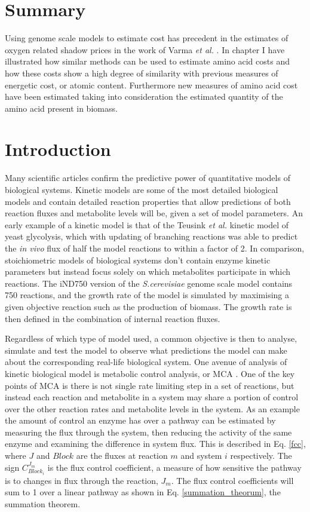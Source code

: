 \section*{Summary}

Using genome scale models to estimate cost has precedent in the estimates of oxygen related shadow prices in the work of Varma \emph{et al.} \cite{varma1993}. In chapter I have illustrated how similar methods can be used to estimate amino acid costs and how these costs show a high degree of similarity with previous measures of energetic cost, or atomic content. Furthermore new measures of amino acid cost have been estimated taking into consideration the estimated quantity of the amino acid present in biomass.

\clearpage

\section{Introduction}

Many scientific articles confirm the predictive power of quantitative models of biological systems. Kinetic models are some of the most detailed biological models and contain detailed reaction properties that allow predictions of both reaction fluxes and metabolite levels will be, given a set of model parameters. An early example of a kinetic model is that of the Teusink \emph{et al.} \cite{teusink2000} kinetic model of yeast glycolysis, which with updating of branching reactions was able to predict the \emph{in vivo} flux of half the model reactions to within a factor of 2. In comparison, stoichiometric models of biological systems don't contain enzyme kinetic parameters but instead focus solely on which metabolites participate in which reactions. The iND750 version of the \emph{S.cerevisiae} genome scale model \cite{duarte2004} contains 750 reactions, and the growth rate of the model is simulated by maximising a given objective reaction such as the production of biomass. The growth rate is then defined in the combination of internal reaction fluxes.

Regardless of which type of model used, a common objective is then to analyse, simulate and test the model to observe what predictions the model can make about the corresponding real-life biological system. One avenue of analysis of kinetic biological model is metabolic control analysis, or MCA \cite{fell1997}. One of the key points of MCA is there is not single rate limiting step in a set of reactions, but instead each reaction and metabolite in a system may share a portion of control over the other reaction rates and metabolite levels in the system. As an example the amount of control an enzyme has over a pathway can be estimated by measuring the flux through the system, then reducing the activity of the same enzyme and examining the difference in system flux. This is described in Eq. \ref{fcc}, where $J$ and $Block$ are the fluxes at reaction $m$ and system $i$ respectively. The sign $C_{Block_i}^{J_m}$ is the flux control coefficient, a measure of how sensitive the pathway is to changes in flux through the reaction, $J_{m}$. The flux control coefficients will sum to 1 over a linear pathway as shown in Eq. \ref{summation_theorum}, the summation theorem.

